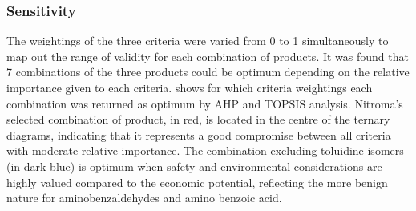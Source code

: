 
\subsubsection{Sensitivity}

The weightings of the three criteria were varied from 0 to 1 simultaneously to map out the range of validity for each combination of products. It was found that 7 combinations of the three products could be optimum depending on the relative importance given to each criteria.  shows for which criteria weightings each combination was returned as optimum by AHP and TOPSIS analysis. Nitroma's selected combination of product, in red, is located in the centre of the ternary diagrams, indicating that it represents a good compromise between all criteria with moderate relative importance. The combination excluding toluidine isomers (in dark blue) is optimum when safety and environmental considerations are highly valued compared to the economic potential, reflecting the more benign nature for aminobenzaldehydes and amino benzoic acid. 

